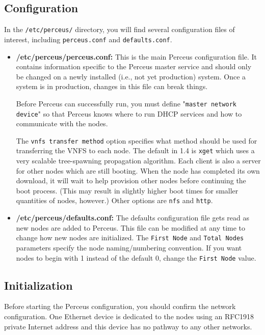 \documentclass[10pt,letterpaper]{report}
\begin{document}
\subsection{Configuration}

In the {\tt /etc/perceus/} directory, you will find several configuration
files of interest, including {\tt perceus.conf} and {\tt defaults.conf}.

\begin{itemize}

\item {\bf /etc/perceus/perceus.conf:} This is the main Perceus configuration
file.  It contains information specific to the Perceus master service and
should only be changed on a newly installed (i.e., not yet production) system.
Once a system is in production, changes in this file can break things.

Before Perceus can successfully run, you must define "{\tt master network
device}" so that Perceus knows where to run DHCP services and how to
communicate with the nodes.

The {\tt vnfs transfer method} option specifies what method should be used for
transferring the VNFS to each node.  The default in 1.4 is {\tt xget} which
uses a very scalable tree-spawning propagation algorithm.  Each client is also
a server for other nodes which are still booting.  When the node has completed
its own download, it will wait to help provision other nodes before continuing
the boot process.  (This may result in slightly higher boot times for smaller
quantities of nodes, however.)  Other options are {\tt nfs} and {\tt http}.

\item {\bf /etc/perceus/defaults.conf:} The defaults configuration file gets
read as new nodes are added to Perceus.  This file can be modified at any time
to change how new nodes are initialized.  The {\tt First Node} and {\tt Total
Nodes} parameters specify the node naming/numbering convention.  If you want
nodes to begin with 1 instead of the default 0, change the {\tt First
Node} value.

\end{itemize}

\subsection{Initialization}

Before starting the Perceus configuration, you should confirm the network
configuration. One Ethernet device is dedicated to the nodes using an RFC1918
private Internet address and this device has no pathway to any other networks.
\end{document}
